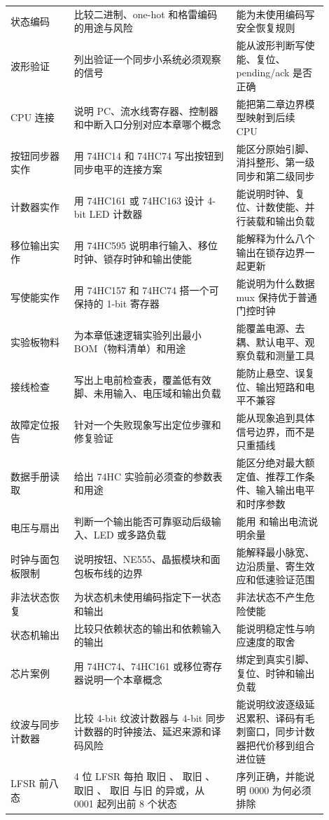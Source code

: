 \begin{longtable}{L{0.18\linewidth}L{0.46\linewidth}L{0.26\linewidth}}
状态编码 & 比较二进制、one-hot 和格雷编码的用途与风险 & 能为未使用编码写安全恢复规则 \\
波形验证 & 列出验证一个同步小系统必须观察的信号 & 能从波形判断写使能、复位、pending/ack 是否正确 \\
CPU 连接 & 说明 PC、流水线寄存器、控制器和中断入口分别对应本章哪个概念 & 能把第二章边界模型映射到后续 CPU \\
按钮同步器实作 & 用 74HC14 和 74HC74 写出按钮到同步电平的连接方案 & 能区分原始引脚、消抖整形、第一级同步和第二级同步 \\
计数器实作 & 用 74HC161 或 74HC163 设计 4-bit LED 计数器 & 能说明时钟、复位、计数使能、并行装载和输出负载 \\
移位输出实作 & 用 74HC595 说明串行输入、移位时钟、锁存时钟和输出使能 & 能解释为什么八个输出在锁存边界一起更新 \\
写使能实作 & 用 74HC157 和 74HC74 搭一个可保持的 1-bit 寄存器 & 能说明为什么数据 mux 保持优于普通门控时钟 \\
实验板物料 & 为本章低速逻辑实验列出最小 BOM（物料清单）和用途 & 能覆盖电源、去耦、默认电平、观察负载和测量工具 \\
接线检查 & 写出上电前检查表，覆盖低有效脚、未用输入、电压域和输出负载 & 能防止悬空、误复位、输出短路和电平不兼容 \\
故障定位报告 & 针对一个失败现象写出定位步骤和修复验证 & 能从现象追到具体信号边界，而不是只重插线 \\
数据手册读取 & 给出 74HC 实验前必须查的参数表和用途 & 能区分绝对最大额定值、推荐工作条件、输入输出电平和时序参数 \\
电压与扇出 & 判断一个输出能否可靠驱动后级输入、LED 或多路负载 & 能用  和输出电流说明余量 \\
时钟与面包板限制 & 说明按钮、NE555、晶振模块和面包板布线的边界 & 能解释最小脉宽、边沿质量、寄生效应和低速验证范围 \\
非法状态恢复 & 为状态机未使用编码指定下一状态和输出 & 非法状态不产生危险使能 \\
状态机输出 & 比较只依赖状态的输出和依赖输入的输出 & 能说明稳定性与响应速度的取舍 \\
芯片案例 & 用 74HC74、74HC161 或移位寄存器说明一个本章概念 & 绑定到真实引脚、复位、时钟和输出负载 \\
纹波与同步计数器 & 比较 4-bit 纹波计数器与 4-bit 同步计数器的时钟接法、延迟来源和译码风险 & 能说明纹波逐级延迟累积、译码有毛刺窗口，同步计数器把代价移到组合进位链 \\
LFSR 前八态 & 4 位 LFSR 每拍  取旧 、 取旧 、 取旧 、 取旧  与旧  的异或，从 0001 起列出前 8 个状态 & 序列正确，并能说明 0000 为何必须排除 \\

\end{longtable}
